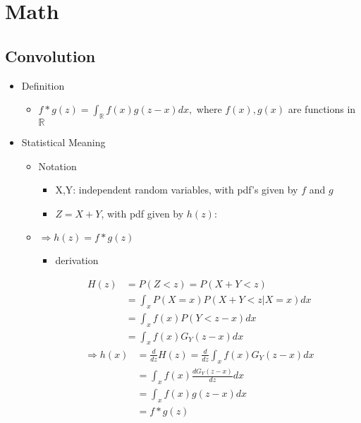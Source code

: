 \chapter{Math}

\section{Convolution}

\begin{itemize}
\item Definition
	\begin{itemize}
	\item $\displaystyle f* g (z) = \int_{\mathbb R}f(x)g(z-x) dx,$ where $f(x),g(x)$ are functions in $\mathbb R$
	\end{itemize}
	
\item Statistical Meaning
	\begin{itemize}
	
	\item Notation
		\begin{itemize}
		\item X,Y: independent random variables, with pdf's given by $f$ and $g$
		\item $Z = X+Y$, with pdf given by $h(z)$:
		\end{itemize}
		
	\item $\Rightarrow h(z) = f * g (z)$
		\begin{itemize}
		\item derivation
		\end{itemize}
	\begin{align*} H(z) &= P(Z<z) = P(X+Y<z) \\ &= \int_x P(X=x)P(X+Y<z|X=x) dx \\ &= \int_x f(x)P(Y<z-x)dx \\ &= \int_x f(x)G_Y(z-x)dx  \end{align*} 
	\begin{align*} \Rightarrow h(x) &= \frac d {dz} H(z) = \frac d {dz} \int_x f(x)G_Y(z-x)dx \\ &= \int_x f(x) \frac {dG_Y(z-x)}{dz} dx \\ &= \int_x f(x) g(z-x)dx \\ &= f * g (z) \end{align*}
	
	\end{itemize}
\end{itemize}
 
